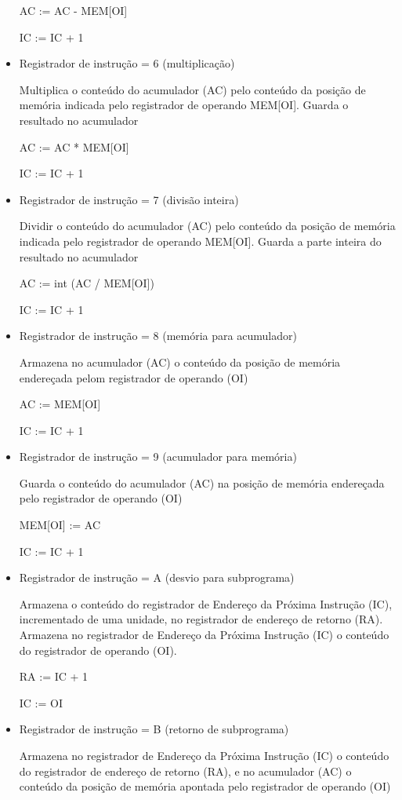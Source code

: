 \begin{itemize}
	AC := AC - MEM[OI]

	IC := IC + 1 
		
	\item Registrador de instrução = 6 (multiplicação)

	Multiplica o conteúdo do acumulador (AC) pelo conteúdo da posição de memória indicada pelo registrador de operando MEM[OI]. Guarda o resultado no acumulador

	AC := AC * MEM[OI] 

	IC := IC + 1

	\item Registrador de instrução = 7 (divisão inteira)

	Dividir o conteúdo do acumulador (AC) pelo conteúdo da posição de memória indicada pelo registrador de operando MEM[OI]. Guarda a parte inteira do resultado no acumulador

	AC := int (AC / MEM[OI])

	IC := IC + 1 
			
	\item Registrador de instrução = 8 (memória para acumulador)

	Armazena no acumulador (AC) o conteúdo da posição de memória endereçada pelom registrador de operando (OI) 

	AC := MEM[OI]		

	IC := IC + 1
			
	\item Registrador de instrução = 9 (acumulador para memória)

	Guarda o conteúdo do acumulador (AC) na posição de memória endereçada pelo registrador de operando (OI) 

	MEM[OI] := AC		
	
	IC := IC + 1 
			
	\item Registrador de instrução = A (desvio para subprograma)

	Armazena o conteúdo do registrador de Endereço da Próxima Instrução (IC), incrementado de uma unidade, no registrador de endereço de retorno (RA). Armazena no registrador de Endereço da Próxima Instrução (IC) o conteúdo do registrador de operando (OI).

	RA := IC + 1
	
	IC := OI

	\item Registrador de instrução = B (retorno de subprograma)

	Armazena no registrador de Endereço da Próxima Instrução (IC) o conteúdo do registrador de endereço de retorno (RA), e no acumulador (AC) o conteúdo da posição de memória apontada pelo registrador de operando (OI) 


\end{itemize}
